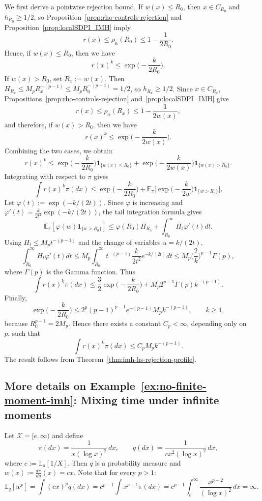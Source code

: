 \documentclass[10pt, journal]{IEEEtran}
\begin{document}
We first derive a pointwise rejection bound. If $w(x)\le R_0$, then $x\in C_{R_0}$ and $h_{R_0}\ge1/2$, so Proposition~\ref{prop:rho-controls-rejection} and Proposition~\ref{prop:localSDPI_IMH} imply
$$r(x)\le \rho_\alpha(R_0)\le 1-\frac{1}{2R_0}.$$
Hence, if $w(x)\le R_0$, then we have 
$$r(x)^k\le \exp\Big(-\frac{k}{2R_0}\Big).$$
If $w(x)>R_0$, set $R_x:=w(x)$. Then $H_{R_x}\le M_pR_x^{-(p-1)}\le M_pR_0^{-(p-1)}=1/2$, so $h_{R_x}\ge1/2$. Since $x\in C_{R_x}$, Propositions~\ref{prop:rho-controls-rejection} and~\ref{prop:localSDPI_IMH} give
$$r(x)\le \rho_\alpha(R_x)\le 1-\frac{1}{2w(x)},$$
and therefore, if $w(x)>R_0$, then we have 
$$r(x)^k\le \exp\Big(-\frac{k}{2w(x)}\Big).$$
Combining the two cases, we obtain 
$$r(x)^k\le \exp\Big(-\frac{k}{2R_0}\Big)\mathbf 1_{\{w(x)\le R_0\}}+\exp\Big(-\frac{k}{2w(x)}\Big)\mathbf 1_{\{w(x)>R_0\}}.$$
Integrating with respect to $\pi$ gives
$$\int r(x)^k\pi(dx)\le \exp\Big(-\frac{k}{2R_0}\Big)+\mathbb E_\pi\Big[\exp\Big(-\frac{k}{2w}\Big)\mathbf 1_{\{w>R_0\}}\Big].$$
Let $\varphi(t):=\exp(-k/(2t))$. Since $\varphi$ is increasing and $\varphi'(t)=\frac{k}{2t^2}\exp(-k/(2t))$, the tail integration formula gives
$$\mathbb E_\pi[\varphi(w)\mathbf 1_{\{w>R_0\}}]\le \varphi(R_0)H_{R_0}+\int_{R_0}^\infty H_t\varphi'(t)dt.$$
Using $H_t\le M_pt^{-(p-1)}$ and the change of variables $u=k/(2t)$,
$$\int_{R_0}^\infty H_t\varphi'(t)dt\le M_p\int_{R_0}^\infty t^{-(p-1)}\frac{k}{2t^2}e^{-k/(2t)}dt\le M_p\Big(\frac2k\Big)^{p-1}\Gamma(p),$$
where $\Gamma(p)$ is the Gamma function. 
Thus
$$\int r(x)^k\pi(dx)\le \frac32\exp\Big(-\frac{k}{2R_0}\Big)+M_p2^{p-1}\Gamma(p)k^{-(p-1)}.$$
Finally,
$$\exp\Big(-\frac{k}{2R_0}\Big)\le 2^p(p-1)^{p-1}e^{-(p-1)}M_p k^{-(p-1)},\qquad k\ge1,$$
because $R_0^{p-1}=2M_p$. Hence there exists a constant $C_p<\infty$, depending only on $p$, such that
$$\int r(x)^k\pi(dx)\le C_pM_p k^{-(p-1)}.$$
The result follows from Theorem~\ref{thm:imh-hs-rejection-profile}.
\subsection{More details on Example~\ref{ex:no-finite-moment-imh}: Mixing time under infinite moments}\label{app:example}
Let $\mathcal X=[e,\infty)$ and define
$$\pi(dx)=\frac{1}{x(\log x)^2}\,dx,\qquad q(dx)=\frac{1}{c x^2(\log x)^2}\,dx,$$
where $c:=\mathbb E_\pi[1/X]$. Then $q$ is a probability measure and
$w(x)\coloneqq \frac{d\pi}{dq}(x)=cx.$
Note that for every $p>1$:
$$\mathbb E_q[w^p]=\int (cx)^p q(dx)=c^{p-1}\int x^{p-1}\pi(dx)=c^{p-1}\int_e^\infty\frac{x^{p-2}}{(\log x)^2}\,dx=\infty.$$
\end{document}
